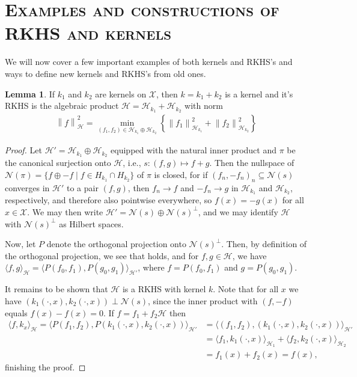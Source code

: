 \documentclass[10pt,twoside,openany,final]{memoir}
\newcommand{\sssection}[1]{%
\section[#1]{\centering\normalfont\scshape \textbf{#1}}}
\theoremstyle{definition}
\newtheorem{lemma}[theorem]{Lemma}
\theoremstyle{Break}
\newcommand{\lv}{\left\lVert}
\newcommand{\rv}{\right\rVert}
\renewcommand{\H}{\mathcal{H}}
\begin{document}
\sssection{Examples and constructions of RKHS and kernels}
We will now cover a few important examples of both kernels and RKHS's and ways to define new kernels and RKHS's from old ones.
\begin{lemma}
	If $k_1$ and $k_2$ are kernels on $\mathcal{X}$, then $k=k_1+k_2$ is a kernel and it's RKHS is the algebraic product $\H = \H_{k_1} + \H_{k_2}$ with norm 
	\begin{align}
		\lv f \rv_\H^2 = \min_{(f_1,f_2) \in \H_{k_1}\oplus \H_{k_2}} \left\{ \lv f_1\rv_{\H_{k_1}}^2 + \lv f_2 \rv_{\H_{k_2}}^2  \right\} \label{eqkernsum}
	\end{align}
	\label{sumkern}
\end{lemma}
\begin{proof}
	Let $\H'=\H_{k_1} \oplus \H_{k_2}$ equipped with the natural inner product and $\pi$ be the canonical surjection onto $\H$, i.e., $s \colon (f,g) \mapsto f+g$. Then the nullspace of $\mathcal{N}(\pi)=\{f \oplus -f \mid f \in H_{k_1} \cap H_{k_2} \}$ of $\pi$ is closed, for if $(f_n,-f_n)_n \subseteq \mathcal{N}(s)$ converges in $\H'$ to a pair $(f,g)$, then $f_n \to f$ and $-f_n \to g$ in $\H_{k_1}$ and $\H_{k_2}$, respectively, and therefore also pointwise everywhere, so $f(x)=-g(x)$ for all $x \in \mathcal{X}$. We may then write $\H' = \mathcal{N}(s) \oplus \mathcal{N}(s)^\perp$, and we may identify $\H$ with $\mathcal{N}(s)^\perp$ as Hilbert spaces.

	Now, let $P$ denote the orthogonal projection onto $\mathcal{N}(s)^\perp$. Then, by definition of the orthogonal projection, we see that  holds, and for $f,g \in \H$, we have $\langle f,g \rangle_{\H} = \langle P(f_0,f_1), P(g_0,g_1)\rangle_{\H'}$, where $f=P(f_0,f_1)$ and $g=P(g_0,g_1)$.

	It remains to be shown that $\H$ is a RKHS with kernel $k$. Note that for all $x$ we have $(k_{1}(\cdot, x ) , k_2(\cdot,x)) \perp \mathcal{N}(s)$, since the inner product with $(f,-f)$ equals $f(x)-f(x)=0$. If $f = f_1+f_2 \H$ then 
	\begin{align*}
		\langle f, k_x \rangle_{\H} = \langle P(f_1,f_2) , P(k_{1}(\cdot, x ) , k_2(\cdot , x)) \rangle_{\H'} &= \langle (f_1,f_2) , (k_1(\cdot,x),k_2(\cdot,x))\rangle_{\H'}\\
		&= \langle f_1 , k_{1}(\cdot,x)\rangle_{\H_1}+ \langle f_2, k_{2}(\cdot,x) \rangle_{\H_2} \\
		&= f_1(x)+f_2(x)=f(x),
	\end{align*}
	finishing the proof.
\end{proof}
\end{document}
